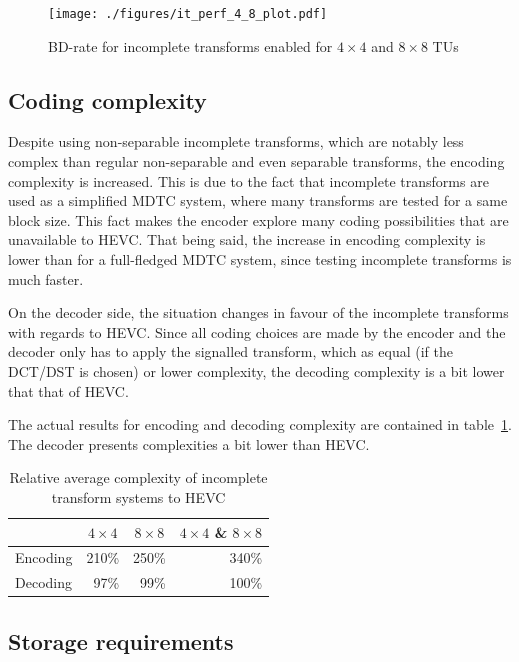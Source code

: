 \documentclass[11pt,a4paper,openright,twoside]{book}
\numberwithin{equation}{section} %
\numberwithin{figure}{section} %
\numberwithin{table}{section} %
\begin{document}
\begin{figure}[tb]
	\centering
	\texttt{[image: ./figures/it\_perf\_4\_8\_plot.pdf]}
	\caption{\acs{BD}-rate for incomplete transforms enabled for $4\times4$
	and $8\times8$ \acsp{TU}}
	\label{fig:it_perf_4_8}
\end{figure}

\subsection{Coding complexity}
\label{sub:it_coding_complexity}

Despite using non-separable incomplete transforms, which are notably less
complex than regular non-separable and even separable transforms, the encoding
complexity is increased.
This is due to the fact that incomplete transforms are used as a simplified
\ac{MDTC} system, where many transforms are tested for a same block size.
This fact makes the encoder explore many coding possibilities that are
unavailable to \ac{HEVC}.
That being said, the increase in encoding complexity is lower than for a
full-fledged \ac{MDTC} system, since testing incomplete transforms is much
faster.

On the decoder side, the situation changes in favour of the incomplete
transforms with regards to \ac{HEVC}.
Since all coding choices are made by the encoder and the decoder only has to
apply the signalled transform, which as equal (if the \ac{DCT}/\ac{DST} is
chosen) or lower complexity, the decoding complexity is a bit lower that that
of \ac{HEVC}.

The actual results for encoding and decoding complexity are contained in
table~\ref{tab:it_complexity}.
The decoder presents complexities a bit lower than \ac{HEVC}.

\begin{table}[tb]
	\centering
	\small
	\begin{tabular}{l|r|r|r}
		& \multicolumn{1}{c|}{$4\times4$}
		& \multicolumn{1}{c|}{$8\times8$}
		& \multicolumn{1}{c}{$4\times4$ \& $8\times8$} \\
		\hline\hline
		Encoding & 210\% & 250\% & 340\% \\
		Decoding &  97\% &  99\% & 100\% \\
	\end{tabular}
	\caption{Relative average complexity of incomplete transform systems to
	\acs{HEVC}}
	\label{tab:it_complexity}
\end{table}


\subsection{Storage requirements}
\label{sub:it_storage_requirements}
\end{document}
